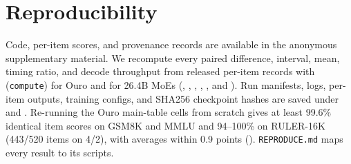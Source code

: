 \documentclass[11pt]{article}
\begin{document}
\FloatBarrier
\section{Reproducibility}
\label{app:repro}

Code, per-item scores, and provenance records are available in the anonymous supplementary material.
We recompute every paired difference, interval, mean, timing ratio, and decode throughput from released per-item records
with  (\texttt{compute}) for Ouro and  for 26.4B MoEs
(, , ,
, , and ).
Run manifests, logs, per-item outputs, training configs, and SHA256 checkpoint hashes are saved under
 and . Re-running the Ouro main-table cells from scratch gives at
least 99.6\% identical item scores on GSM8K and MMLU and 94--100\% on RULER-16K (443/520 items on 4/2), with averages
within 0.9 points (). \texttt{REPRODUCE.md} maps every result to its scripts.
\end{document}
